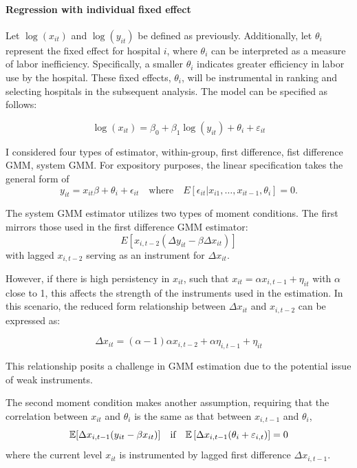 \documentclass[12pt]{article}
\begin{document}
\paragraph{Regression with individual fixed effect}

Let $\log(x_{it})$ and $\log(y_{it})$ be defined as previously. Additionally,
let $\theta_i$ represent the fixed effect for hospital $i$, where $\theta_i$
can be interpreted as a measure of labor inefficiency. Specifically, a smaller
$\theta_i$ indicates greater efficiency in labor use by the hospital. These
fixed effects, $\theta_i$, will be instrumental in ranking and selecting
hospitals in the subsequent analysis. The model can be specified as follows:

\begin{equation}
    \log(x_{it}) = \beta_0 + \beta_1 \log(y_{it}) + \theta_i + \varepsilon_{it}
\end{equation}

I considered four types of estimator, within-group, first difference, fist
difference GMM, system GMM. For expository purposes, the linear specification
takes the general form of
\begin{equation*}
    y_{it} = x_{it} \beta +\theta_i + \epsilon_{it}\quad \text{where} \quad E[\epsilon_{it}|x_{i1},\ldots, x_{it-1},\theta_i]=0.
\end{equation*}

The system GMM estimator utilizes two types of moment conditions. The first
mirrors those used in the first difference GMM estimator:
\[E[x_{i,t-2}(\Delta y_{it}-\beta\Delta x_{it})]\]
with lagged $x_{i,t-2}$ serving as an instrument for $\Delta x_{it}$.

However, if there is high persistency in \( x_{it} \), such that \( x_{it} =
\alpha x_{i,t-1} + \eta_{it} \) with \( \alpha \) close to 1, this affects the
strength of the instruments used in the estimation. In this scenario, the
reduced form relationship between \( \Delta x_{it} \) and \( x_{i,t-2} \) can
be expressed as:

\begin{equation*}
    \Delta x_{it} = (\alpha-1)\alpha x_{i,t-2} + \alpha \eta_{i,t-1} + \eta_{it}
\end{equation*}

This relationship posits a challenge in GMM estimation due to the potential
issue of weak instruments.

The second moment condition makes another assumption, requiring that the
correlation between $x_{it}$ and $\theta_i$ is the same as that between
$x_{i,t-1}$ and $\theta_i$,
\begin{equation*}
    \mathbb{E}[\Delta x_{i,t-1}(y_{it}-\beta x_{it})] \quad \text{if}\quad \mathbb{E}\left[\Delta x_{i,t-1}(\theta_i+\varepsilon_{i,t})\right]=0
\end{equation*} where the current level $x_{it}$ is instrumented by lagged first difference $\Delta x_{i,t-1}$.
\end{document}
